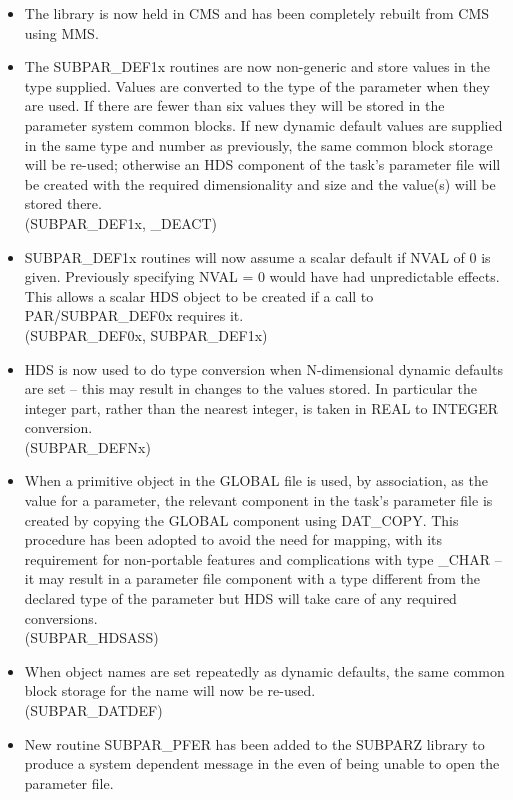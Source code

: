 \begin{itemize}
\item The library is now held in CMS and has been completely rebuilt from CMS 
using MMS.
\item The SUBPAR\_DEF1x routines are now non-generic and store values in the 
type supplied. Values are converted to the type of the parameter when they are
used.
If there are fewer than six values they will be stored in the parameter system
common blocks.
If new dynamic default values are supplied in the same type and number as
previously, the same common block storage will be re-used; otherwise an HDS
component of the task's parameter file will be created with the required
dimensionality and size and the value(s) will be stored there.\\
(SUBPAR\_DEF1x, \_DEACT)
\item SUBPAR\_DEF1x routines will now assume a scalar default if NVAL of 0 is
given. Previously specifying NVAL = 0 would have had unpredictable effects.
This allows a scalar HDS object to be created if a call to PAR/SUBPAR\_DEF0x
requires it.\\
(SUBPAR\_DEF0x, SUBPAR\_DEF1x)
\item HDS is now used to do type conversion when N-dimensional dynamic defaults
are set -- this may result in changes to the values stored. 
In particular the integer part, rather than the nearest integer, is taken in 
REAL to INTEGER conversion.\\
(SUBPAR\_DEFNx)
\item When a primitive object in the GLOBAL file is used, by association, as 
the value for a parameter, the relevant component in the task's parameter file
is created by copying the GLOBAL component using DAT\_COPY.
This procedure has been adopted to avoid the need for mapping, with its
requirement for non-portable features and complications with type \_CHAR --
it may result in a parameter file component with a type different from the
declared type of the parameter but HDS will take care of any required
conversions.\\
(SUBPAR\_HDSASS)
\item When object names are set repeatedly as dynamic defaults, the same common
block storage for the name will now be re-used.\\
(SUBPAR\_DATDEF)
\item New routine SUBPAR\_PFER has been added to the SUBPARZ library to
produce a system dependent message in the even of being unable to open the
parameter file.\\

\end{itemize}

